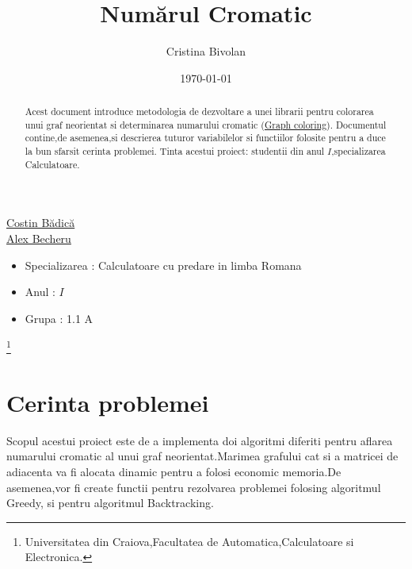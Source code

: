 \documentclass[12pt]{article}
\begin{document}

\title{Num\u{a}rul Cromatic \\}
\author{Cristina Bivolan}
\date{\today}
\maketitle

\begin{tabbing}
  \=\href{http://software.ucv.ro/~cbadica}{Costin B\u{a}dic\u{a}} \\
  \=\href{http://www.becheru.net/}{Alex Becheru} \\
\end{tabbing}


\begin{abstract}
 Acest document introduce metodologia de dezvoltare a unei librarii pentru colorarea unui graf neorientat si determinarea numarului cromatic (\href{https://en.wikipedia.org/wiki/Graph_coloring}{Graph coloring}). Documentul contine,de asemenea,si descrierea tuturor variabilelor si functiilor folosite pentru a duce la bun sfarsit cerinta problemei. Tinta acestui proiect: studentii din anul $I$,specializarea Calculatoare.
\end{abstract}

\begin{quote}
\end{quote}

\begin{itemize}
  \item Specializarea : Calculatoare cu predare in limba Romana
  \item Anul : $I$
  \item Grupa : 1.1 A
\end{itemize}

\vfill

\thanks{Universitatea din Craiova,Facultatea de Automatica,Calculatoare si Electronica.}

\pagebreak


\section{Cerinta problemei}
Scopul acestui proiect este de a implementa doi algoritmi diferiti pentru aflarea numarului cromatic al unui graf neorientat.Marimea grafului cat si a matricei de adiacenta va fi alocata dinamic pentru a folosi economic memoria.De asemenea,vor fi create functii pentru rezolvarea problemei folosing algoritmul Greedy, si pentru algoritmul Backtracking.
\end{document}
